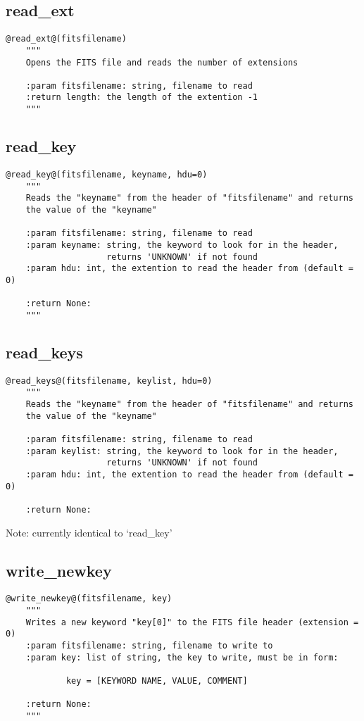 \subsection{read\_ext}
\begin{lstlisting}[style=pythonstyle]
@read_ext@(fitsfilename)
    """
    Opens the FITS file and reads the number of extensions

    :param fitsfilename: string, filename to read
    :return length: the length of the extention -1
    """
\end{lstlisting}

\subsection{read\_key}
\begin{lstlisting}[style=pythonstyle]
@read_key@(fitsfilename, keyname, hdu=0)
    """
    Reads the "keyname" from the header of "fitsfilename" and returns
    the value of the "keyname"

    :param fitsfilename: string, filename to read
    :param keyname: string, the keyword to look for in the header,
                    returns 'UNKNOWN' if not found
    :param hdu: int, the extention to read the header from (default = 0)

    :return None:
    """
\end{lstlisting}

\subsection{read\_keys}
\begin{lstlisting}[style=pythonstyle]
@read_keys@(fitsfilename, keylist, hdu=0)
    """
    Reads the "keyname" from the header of "fitsfilename" and returns
    the value of the "keyname"

    :param fitsfilename: string, filename to read
    :param keylist: string, the keyword to look for in the header,
                    returns 'UNKNOWN' if not found
    :param hdu: int, the extention to read the header from (default = 0)

    :return None:
\end{lstlisting}

\noindent Note: currently identical to `read\_key'

\subsection{write\_newkey}
\begin{lstlisting}[style=pythonstyle]
@write_newkey@(fitsfilename, key)
    """
    Writes a new keyword "key[0]" to the FITS file header (extension = 0)
    :param fitsfilename: string, filename to write to
    :param key: list of string, the key to write, must be in form:

            key = [KEYWORD NAME, VALUE, COMMENT]

    :return None:
    """
\end{lstlisting}


